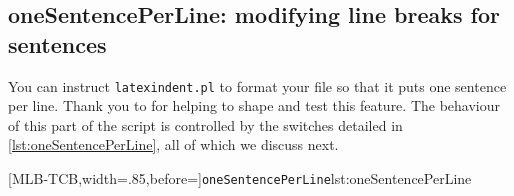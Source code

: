 \subsection{oneSentencePerLine: modifying line breaks for sentences}\label{sec:onesentenceperline}

 You can instruct \texttt{latexindent.pl} to format  your file so that it puts one sentence per line. Thank you to \cite{mlep} for
 helping to shape and test this feature. The behaviour of this part of the script is
 controlled by the switches detailed in \cref{lst:oneSentencePerLine}, all of which we
 discuss next. 
  

 [MLB-TCB,width=.85\linewidth,before=\centering]{\texttt{oneSentencePerLine}}{lst:oneSentencePerLine}

